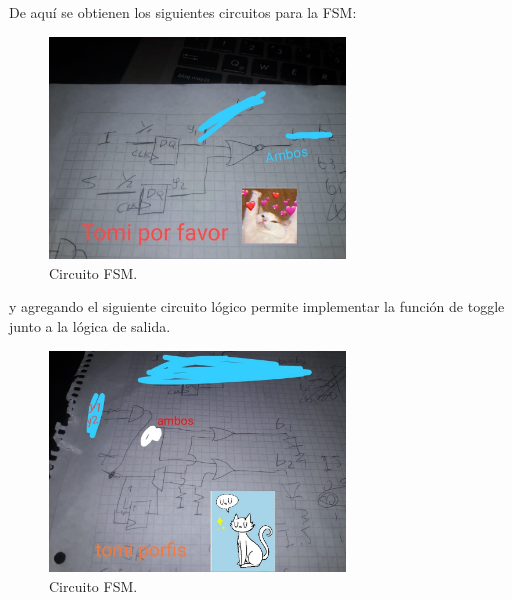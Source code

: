 De aquí se obtienen los siguientes circuitos para la FSM:
 \begin{figure}[H]
	\centering
	\includegraphics[width=0.7\textwidth]{ImagenesEjercicio1/fsm.jpeg}
	\caption{Circuito FSM.}
	\label{fig:fsm}
\end{figure}
y agregando el siguiente circuito lógico permite implementar la función de toggle junto a la lógica de salida.
 \begin{figure}[H]
	\centering
	\includegraphics[width=0.7\textwidth]{ImagenesEjercicio1/post_logic.jpeg}
	\caption{Circuito FSM.}
	\label{fig:fsm}
\end{figure}

